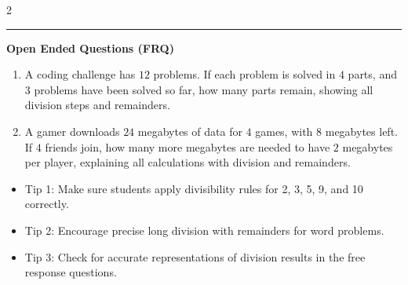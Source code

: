 \documentclass[10pt]{article}
\begin{document}
\begin{multicols}{2}
\begin{enumerate}[label=\textbf{Q\arabic*.}, leftmargin=*, itemsep=6pt, parsep=0pt]
\end{enumerate}
\end{multicols}

\vspace{-0.2cm}
\hrule
\vspace{0.2cm}
\textbf{\small Open Ended Questions (FRQ)}
\begin{enumerate}[label=\textbf{Q\arabic*.}, start=9, itemsep=5pt, topsep=0pt]

  \item \small A coding challenge has $12$ problems. If each problem is solved in $4$ parts, and $3$ problems have been solved so far, how many parts remain, showing all division steps and remainders. \vspace{2cm}

  \item \small A gamer downloads $24$ megabytes of data for $4$ games, with $8$ megabytes left. If $4$ friends join, how many more megabytes are needed to have $2$ megabytes per player, explaining all calculations with division and remainders. \vspace{2cm}

\end{enumerate}

\vfill

\begin{tcolorbox}[colback=blue!5, colframe=mainblue!50, title=\small \textbf{Chef's Tips}, fonttitle=\bfseries, bottom=1mm]
\begin{itemize}[noitemsep, topsep=2pt, leftmargin=0.5cm]
  \item \scriptsize Tip 1: Make sure students apply divisibility rules for 2, 3, 5, 9, and 10 correctly.\item \scriptsize Tip 2: Encourage precise long division with remainders for word problems.\item \scriptsize Tip 3: Check for accurate representations of division results in the free response questions.
\end{itemize}
\end{tcolorbox}
\end{document}
